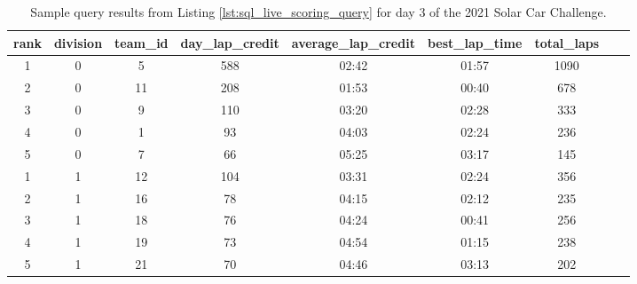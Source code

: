 \documentclass[11pt]{article}
\begin{document}
\begin{table}[H]
    \centering
    \caption{Sample query results from Listing \ref{lst:sql_live_scoring_query} for day 3 of the 2021 Solar Car Challenge.}
    \label{tab:solar_car_data}
    \begin{adjustbox}{max width=\textwidth}
        \begin{tabular}{|c|c|c|c|c|c|c|c|c|}
            \hline
            \textbf{rank} & \textbf{division} & \textbf{team\_id} & \textbf{day\_lap\_credit} & \textbf{average\_lap\_credit} & \textbf{best\_lap\_time} & \textbf{total\_laps} \\
            \hline
            1             & 0                 & 5                 & 588                       & 02:42                         & 01:57                    & 1090                 \\
            2             & 0                 & 11                & 208                       & 01:53                         & 00:40                    & 678                  \\
            3             & 0                 & 9                 & 110                       & 03:20                         & 02:28                    & 333                  \\
            4             & 0                 & 1                 & 93                        & 04:03                         & 02:24                    & 236                  \\
            5             & 0                 & 7                 & 66                        & 05:25                         & 03:17                    & 145                  \\
            1             & 1                 & 12                & 104                       & 03:31                         & 02:24                    & 356                  \\
            2             & 1                 & 16                & 78                        & 04:15                         & 02:12                    & 235                  \\
            3             & 1                 & 18                & 76                        & 04:24                         & 00:41                    & 256                  \\
            4             & 1                 & 19                & 73                        & 04:54                         & 01:15                    & 238                  \\
            5             & 1                 & 21                & 70                        & 04:46                         & 03:13                    & 202                  \\
            \hline
        \end{tabular}
    \end{adjustbox}
\end{table}
\end{document}
